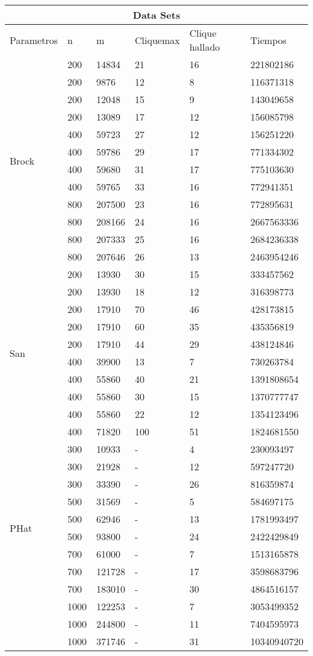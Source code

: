 \begin{tabular}{|l|l|l|l|l|l|} 
\hline \multicolumn{6}{|c|}{Data Sets} \\ 
\hline
Parametros & n & m & Cliquemax & Clique hallado & Tiempos \\ 
\hline \multirow{12}{*}{Brock} 
& 200 & 14834 & 21& 16& 221802186 \\
& 200 & 9876& 12& 8&116371318 \\
& 200& 12048& 15& 9&143049658\\
& 200& 13089& 17& 12& 156085798\\
& 400& 59723& 27& 12& 156251220\\
& 400& 59786& 29& 17& 771334302\\
& 400& 59680& 31& 17& 775103630\\
& 400& 59765& 33& 16& 772941351\\
& 800& 207500& 23& 16& 772895631\\
& 800& 208166& 24& 16& 2667563336\\
& 800& 207333& 25& 16&2684236338\\
& 800& 207646& 26& 13&2463954246\\
\hline \multirow{10}{*}{San} 
& 200 & 13930& 30& 15& 333457562\\
& 200& 13930& 18& 12& 316398773\\
& 200& 17910& 70& 46& 428173815\\
& 200 & 17910& 60& 35& 435356819\\
& 200& 17910& 44& 29& 438124846\\
& 400& 39900& 13& 7& 730263784\\
& 400& 55860& 40& 21& 1391808654\\
& 400& 55860& 30& 15& 1370777747\\
& 400& 55860& 22& 12& 1354123496\\
& 400& 71820& 100& 51& 1824681550 \\
\hline \multirow{10}{*}{PHat} 	
& 300& 10933& -& 4&	230093497 \\
& 300& 21928& -& 12& 597247720 \\
& 300& 33390& -& 26& 816359874  \\
& 500& 31569& -& 5& 584697175 \\
& 500& 62946& -& 13& 1781993497  \\
& 500& 93800& -& 24& 2422429849 \\
& 700& 61000& -& 7& 1513165878 \\
& 700& 121728& -& 17& 3598683796 \\
& 700& 183010& -& 30& 4864516157 \\ 
& 1000& 122253& -& 7& 3053499352 \\
& 1000& 244800& -& 11& 7404595973 \\
& 1000& 371746& -& 31& 10340940720 \\
\hline 
\end{tabular} 


	
	
	
	
	
	
	
	
	
	
	



